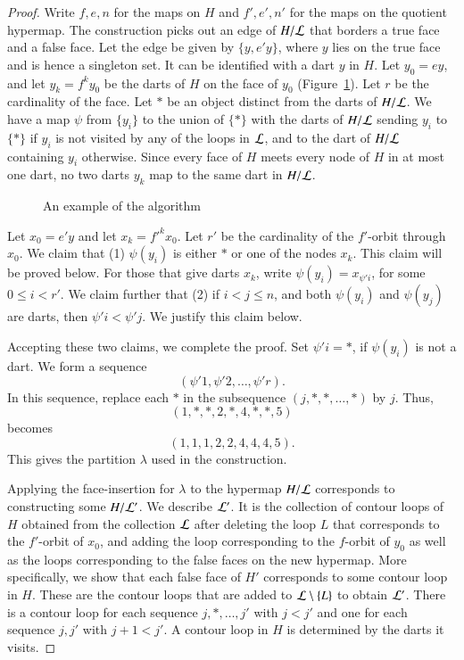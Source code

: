 \begin{proof}
Write $f,e,n$ for the maps on $H$ and $f',e',n'$ for the maps on the
quotient hypermap.   The construction picks out an edge of $H/{\cal
L}$ that borders a true face and a false face. Let the edge be given
by $\{y,e' y\}$, where $y$ lies on the true face and is hence a
singleton set. It can be identified with a dart $y$ in $H$.  Let
$y_0 = e y$, and let $y_k = {f}^k y_0$ be the darts of $H$ on the
face of $y_0$ (Figure~\ref{fig:algordart}).  
Let $r$ be the cardinality of the face. 
Let $*$ be an
object distinct from the darts of $H/{\cal L}$.  We have a map
$\psi$ from $\{y_i\}$ to the union of $\{*\}$ with the darts of
$H/{\cal L}$ sending $y_i$ to $\{*\}$ if $y_i$ is not visited by any
of the loops in ${\cal L}$, and to the dart of $H/{\cal L}$
containing $y_i$ otherwise.
Since every face of $H$ meets every node of $H$
in at most one dart, no two darts
$y_k$ map to the same dart in $H/{\cal L}$.


\begin{figure}[htb]
  \centering
  \caption{An example of the algorithm}
  \label{fig:algordart}
\end{figure}


Let $x_0 = e' y$ and let $x_k = {f'}^k x_0$.  Let $r'$ be the
cardinality of the $f'$-orbit through $x_0$.  
We claim that (1) $\psi(y_i)$ is either $*$ or one of the
nodes $x_k$.  This claim will be proved below.
For those that give darts $x_k$, write $\psi(y_i) =
x_{\psi' i}$, for some $0\le i < r'$. We claim further that (2) if
$i<j\le n$, and both $\psi(y_i)$ and $\psi(y_j)$ are darts, then
$\psi' i < \psi' j$.  We justify this claim below.

Accepting these two claims, we complete the proof.  Set $\psi' i =
*$, if $\psi(y_i)$ is not a dart.  We form a sequence
    $$(\psi' 1,\psi' 2,\ldots,\psi' r).$$
In this sequence, replace each $*$ in the
subsequence $(j,*,*,\ldots,*)$ by $j$. Thus,
    $$(1,*,*,2,*,4,*,*,5)$$
becomes
    $$(1,1,1,2,2,4,4,4,5).$$
This gives the partition $\lambda$ used in the construction.

Applying the face-insertion for $\lambda$ to the hypermap $H/{\cal
L}$ corresponds to constructing some $H/{\cal L}'$.  We describe
${\cal L}'$.  It is the collection of contour loops of $H$ obtained from
the collection ${\cal L}$ after deleting the loop $L$ that 
corresponds to the $f'$-orbit of $x_0$, 
and adding the loop corresponding to the $f$-orbit
of $y_0$ as well as the loops corresponding to the false faces on
the new hypermap.
More specifically, we show that each false face of $H'$
corresponds to some contour loop in $H$. These are the
contour loops that are added to ${\cal L}\setminus\{L\}$ to obtain
${\cal L'}$.  There is a contour loop for each sequence
$j,*,\ldots,j'$ with $j< j'$ and one for each sequence $j,j'$ with
$j+1< j'$.  A contour loop in $H$ is determined by the darts it
visits.  


\end{proof}
